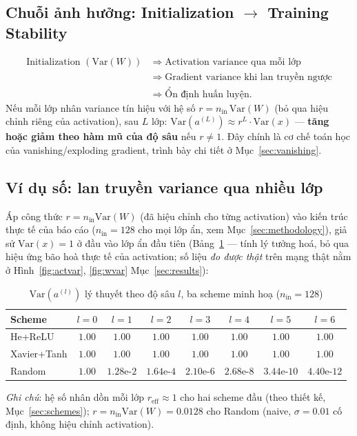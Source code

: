 \documentclass[12pt,a4paper]{article}
\begin{document}
\subsection{Chuỗi ảnh hưởng: Initialization $\to$ Training Stability}

\begin{align*}
\text{Initialization }(\mathrm{Var}(W)) \;&\Rightarrow\; \text{Activation variance qua mỗi lớp} \\
&\Rightarrow\; \text{Gradient variance khi lan truyền ngược} \\
&\Rightarrow\; \text{Ổn định huấn luyện.}
\end{align*}
Nếu mỗi lớp nhân variance tín hiệu với hệ số $r=n_{\text{in}}\,\mathrm{Var}(W)$
(bỏ qua hiệu chỉnh riêng của activation), sau $L$ lớp:
$\mathrm{Var}(a^{(L)}) \approx r^L\cdot\mathrm{Var}(x)$ --- \textbf{tăng
hoặc giảm theo hàm mũ của độ sâu} nếu $r\ne1$. Đây chính là cơ chế toán
học của vanishing/exploding gradient, trình bày chi tiết ở Mục~\ref{sec:vanishing}.

\subsection{Ví dụ số: lan truyền variance qua nhiều lớp}
\label{sec:varprop}

Áp công thức $r=n_{\text{in}}\mathrm{Var}(W)$ (đã hiệu chỉnh cho từng
activation) vào kiến trúc thực tế của báo cáo
($n_{\text{in}}=128$ cho mọi lớp ẩn, xem Mục~\ref{sec:methodology}),
giả sử $\mathrm{Var}(x)=1$ ở đầu vào lớp ẩn đầu tiên (Bảng~\ref{tab:varprop}
--- tính lý tưởng hoá, bỏ qua hiệu ứng bão hoà thực tế của activation;
số liệu \emph{đo được thật} trên mạng thật nằm ở Hình~\ref{fig:actvar},
\ref{fig:wvar} Mục~\ref{sec:results}):

\begin{table}[H]
\centering
\caption{$\mathrm{Var}(a^{(l)})$ lý thuyết theo độ sâu $l$, ba scheme minh hoạ ($n_{\text{in}}=128$)}
\footnotesize
\begin{tabular}{@{}lccccccc@{}}
\toprule
Scheme & $l{=}0$ & $l{=}1$ & $l{=}2$ & $l{=}3$ & $l{=}4$ & $l{=}5$ & $l{=}6$ \\
\midrule
He+ReLU & $1.00$ & $1.00$ & $1.00$ & $1.00$ & $1.00$ & $1.00$ & $1.00$ \\
Xavier+Tanh & $1.00$ & $1.00$ & $1.00$ & $1.00$ & $1.00$ & $1.00$ & $1.00$ \\
Random & $1.00$ & $1.28\text{e-}2$ & $1.64\text{e-}4$ & $2.10\text{e-}6$ & $2.68\text{e-}8$ & $3.44\text{e-}10$ & $4.40\text{e-}12$ \\
\bottomrule
\end{tabular}
\label{tab:varprop}
\end{table}
\emph{Ghi chú}: hệ số nhân dồn mỗi lớp $r_{\text{eff}}\approx1$ cho hai
scheme đầu (theo thiết kế, Mục~\ref{sec:schemes}); $r=n_{\text{in}}\mathrm{Var}(W)=0.0128$
cho Random (naive, $\sigma=0.01$ cố định, không hiệu chỉnh activation).
\end{document}
